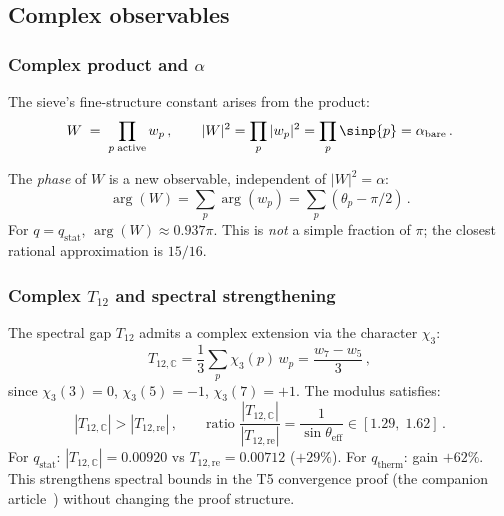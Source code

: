 \documentclass[12pt,a4paper]{article}
\begin{document}
\subsection{Complex observables}
\label{sec:cx_observables}

\subsubsection{Complex product and \texorpdfstring{$\alpha$}{alpha}}

The sieve's fine-structure constant arises from the product:
\begin{equation}
  W \;=\; \prod_{p\;\mathrm{active}} w_p\,,\qquad
  |W|^2 = \prod_{p} |w_p|^2 = \prod_{p} \sinp{p} = \alpha_{\mathrm{bare}}\,.
  \label{eq:W_product}
\end{equation}

The \emph{phase} of $W$ is a new observable, independent of $|W|^2 = \alpha$:
\begin{equation}
  \arg(W) = \sum_p \arg(w_p) = \sum_p (\theta_p - \pi/2)\,.
  \label{eq:argW}
\end{equation}
For $q = q_{\mathrm{stat}}$, $\arg(W) \approx 0.937\pi$.
This is \emph{not} a simple fraction of $\pi$; the closest rational
approximation is $15/16$.

\subsubsection{Complex \texorpdfstring{$T_{12}$}{T12} and spectral strengthening}
\label{subsec:cx_T12}

The spectral gap $T_{12}$ admits a complex extension via the character
$\chi_3$:
\begin{equation}
  T_{12,\mathbb{C}} = \frac{1}{3}\sum_p \chi_3(p)\, w_p
  = \frac{w_7 - w_5}{3}\,,
  \label{eq:T12C}
\end{equation}
since $\chi_3(3) = 0$, $\chi_3(5) = -1$, $\chi_3(7) = +1$. The modulus
satisfies:
\[
  |T_{12,\mathbb{C}}| > |T_{12,\mathrm{re}}|\,,\qquad
  \text{ratio } \frac{|T_{12,\mathbb{C}}|}{|T_{12,\mathrm{re}}|}
  = \frac{1}{\sin\theta_{\mathrm{eff}}} \in [1.29,\; 1.62]\,.
\]
For $q_{\mathrm{stat}}$: $|T_{12,\mathbb{C}}| = 0.00920$ vs
$T_{12,\mathrm{re}} = 0.00712$ ($+29\%$).
For $q_{\mathrm{therm}}$: gain $+62\%$.
This strengthens spectral bounds in the T5 convergence proof
(the companion article~\cite{companion_M3}) without changing the proof structure.
\end{document}
